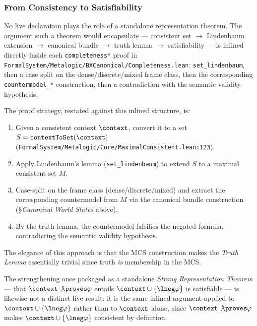 \documentclass[../BimodalReference.tex]{subfiles}
\begin{document}

\subsubsection{From Consistency to Satisfiability}

No live declaration plays the role of a standalone representation theorem.
The argument such a theorem would encapsulate — consistent set $\to$ Lindenbaum extension $\to$ canonical bundle $\to$ truth lemma $\to$ satisfiability — is inlined directly inside each \texttt{completeness*} proof in \texttt{FormalSystem/Metalogic/BXCanonical/Completeness.lean}: \texttt{set\_lindenbaum}, then a case split on the dense/discrete/mixed frame class, then the corresponding \texttt{countermodel\_*} construction, then a contradiction with the semantic validity hypothesis.

The proof strategy, restated against this inlined structure, is:
\begin{enumerate}
  \item Given a consistent context $\context$, convert it to a set $S = \texttt{contextToSet}(\context)$ (\texttt{FormalSystem/Metalogic/Core/MaximalConsistent.lean:123}).
  \item Apply Lindenbaum's lemma (\texttt{set\_lindenbaum}) to extend $S$ to a maximal consistent set $M$.
  \item Case-split on the frame class (dense/discrete/mixed) and extract the corresponding countermodel from $M$ via the canonical bundle construction (\S\emph{Canonical World States} above).
  \item By the truth lemma, the countermodel falsifies the negated formula, contradicting the semantic validity hypothesis.
\end{enumerate}

The elegance of this approach is that the MCS construction makes the \emph{Truth Lemma} essentially trivial since truth \emph{is} membership in the MCS.

The strengthening once packaged as a standalone \emph{Strong Representation Theorem} — that $\context \not\proves \varphi$ entails $\context \cup \{\lneg\varphi\}$ is satisfiable — is likewise not a distinct live result: it is the same inlined argument applied to $\context \cup \{\lneg\varphi\}$ rather than to $\context$ alone, since $\context \not\proves \varphi$ makes $\context \cup \{\lneg\varphi\}$ consistent by definition.
\end{document}
